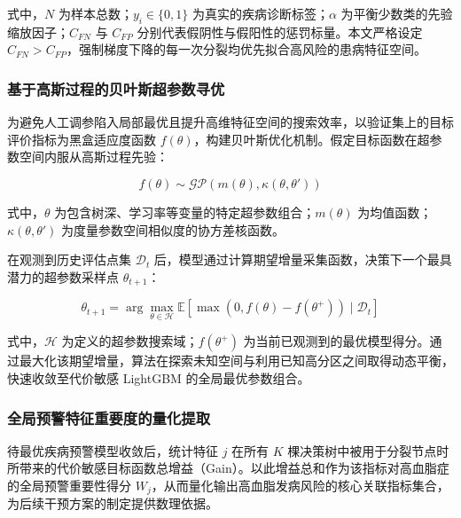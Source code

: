\documentclass[12pt]{article}
\begin{document}
	{\songti{}
		式中，$N$ 为样本总数；$y_i \in \{0,1\}$ 为真实的疾病诊断标签；$\alpha$ 为平衡少数类的先验缩放因子；$C_{FN}$ 与 $C_{FP}$ 分别代表假阴性与假阳性的惩罚标量。本文严格设定 $C_{FN} > C_{FP}$，强制梯度下降的每一次分裂均优先拟合高风险的患病特征空间。
		\par}
	
	\subsubsection{基于高斯过程的贝叶斯超参数寻优}
	{\songti{}
		为避免人工调参陷入局部最优且提升高维特征空间的搜索效率，以验证集上的目标评价指标为黑盒适应度函数 $f(\theta)$，构建贝叶斯优化机制。假定目标函数在超参数空间内服从高斯过程先验：
		\par}
	
	\begin{equation}
		f(\theta) \sim \mathcal{GP}(m(\theta), \kappa(\theta, \theta'))
	\end{equation}
	
	{\songti{}
		式中，$\theta$ 为包含树深、学习率等变量的特定超参数组合；$m(\theta)$ 为均值函数；$\kappa(\theta, \theta')$ 为度量参数空间相似度的协方差核函数。
		\par}
	
	{\songti{}
		在观测到历史评估点集 $\mathcal{D}_t$ 后，模型通过计算期望增量采集函数，决策下一个最具潜力的超参数采样点 $\theta_{t+1}$：
		\par}
	
	\begin{equation}
		\theta_{t+1} = \arg \max_{\theta \in \mathcal{H}} \mathbb{E} \left[ \max(0, f(\theta) - f(\theta^+)) \mid \mathcal{D}_t \right]
	\end{equation}
	
	
	{\songti{}
		式中，$\mathcal{H}$ 为定义的超参数搜索域；$f(\theta^+)$ 为当前已观测到的最优模型得分。通过最大化该期望增量，算法在探索未知空间与利用已知高分区之间取得动态平衡，快速收敛至代价敏感 LightGBM 的全局最优参数组合。
		\par}
	
	\subsubsection{全局预警特征重要度的量化提取}
	{\songti{}
		待最优疾病预警模型收敛后，统计特征 $j$ 在所有 $K$ 棵决策树中被用于分裂节点时所带来的代价敏感目标函数总增益（Gain）。以此增益总和作为该指标对高血脂症的全局预警重要性得分 $W_j$，从而量化输出高血脂发病风险的核心关联指标集合，为后续干预方案的制定提供数理依据。
		\par}
	
\end{document}
